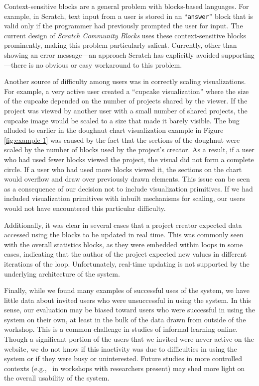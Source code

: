 \documentclass{sigchi}
\begin{document}
Context-sensitive blocks are a general problem with blocks-based languages. For example, in Scratch, text input from a user is stored in an ``\texttt{answer}'' block that is valid only if the programmer had previously prompted the user for input. The current design of \emph{Scratch Community Blocks} uses these context-sensitive blocks prominently, making this problem particularly salient. Currently, other than showing an error message---an approach Scratch has explicitly avoided supporting \cite{maloney_scratch_2010}---there is no obvious or easy workaround to this problem.

Another source of difficulty among users was in correctly scaling visualizations. For example, a very active user created a ``cupcake visualization'' where the size of the cupcake depended on the number of projects shared by the viewer. If the project was viewed by another user with a small number of shared projects, the cupcake image would be scaled to a size that made it barely visible. The bug alluded to earlier in the doughnut chart visualization example in Figure \ref{fig:example-1} was caused by the fact that the sections of the doughnut were scaled by the number of blocks used by the project's creator. As a result, if a user who had used fewer blocks viewed the project, the visual did not form a complete circle. If a user who had used more blocks viewed it, the sections on the chart would overflow and draw over previously drawn elements. This issue can be seen as a consequence of our decision not to include visualization primitives. If we had included visualization primitives with inbuilt mechanisms for scaling, our users would not have encountered this particular difficulty. 

Additionally, it was clear in several cases that a project creator expected data accessed using the blocks to be updated in real time. This was commonly seen with the overall statistics blocks, as they were embedded within loops in some cases, indicating that the author of the project expected new values in different iterations of the loop. Unfortunately, real-time updating is not supported by the underlying architecture of the system.

Finally, while we found many examples of successful uses of the system, we have little data about invited users who were unsuccessful in using the system. In this sense, our evaluation may be biased toward users who were successful in using the system on their own, at least in the bulk of the data drawn from outside of the workshop. This is a common challenge in studies of informal learning online. Though a significant portion of the users that we invited were never active on the website, we do not know if this inactivity was due to difficulties in using the system or if they were busy or uninterested. Future studies in more controlled contexts (e.g.,~ in workshops with researchers present) may shed more light on the overall usability of the system.
\end{document}
